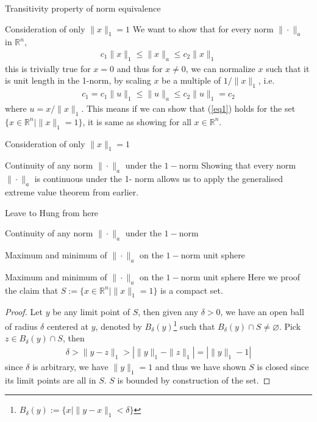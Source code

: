\documentclass[10pt,appendixnumberbeamer]{beamer}
\begin{document}
\begin{frame}{Transitivity property of norm equivalence}

\end{frame}

\begin{frame}{Consideration of only $\|x\|_1 = 1$}
We want to show that for every norm $\|\cdot\|_a$ in $\mathbb{R}^n$,
\begin{align*}
c_1\|x\|_1 \leq \|x\|_a \leq c_2\|x\|_1
\end{align*}
this is trivially true for $x=0$ and thus for $x \neq 0$, we can normalize $x$ such that it is unit length in the 1-norm, by scaling $x$ be a multiple of $1/\|x\|_1$, i.e.
\begin{align}
c_1 = c_1 \|u\|_1\leq \|u\|_a\leq c_2 \|u\|_1 = c_2 \label{eq1}
\end{align}
where $u = x/ \|x\|_1$. This means if we can show that (\ref{eq1}) holds for the set $\{x \in \mathbb{R}^n|\|x\|_1=1\}$, it is same as showing for all $x \in \mathbb{R}^n$.
\end{frame}

\begin{frame}{Consideration of only $\|x\|_1 = 1$}

\end{frame}


\begin{frame}{Continuity of any norm $\|\cdot\|_a$ under the $1-$norm}
Showing that every norm $\|\cdot\|_a$ is continuous under the 1- norm allows us to apply the generalised extreme value theorem from earlier. 

{\color{red}Leave to Hung from here}

\end{frame}

\begin{frame}{Continuity of any norm $\|\cdot\|_a$ under the $1-$norm}

\end{frame}


\begin{frame}{Maximum and minimum of $\|\cdot\|_a$ on the $1-$norm unit sphere}

\end{frame}

\begin{frame}{Maximum and minimum of $\|\cdot\|_a$ on the $1-$norm unit sphere}
Here we proof the claim that $S:=\{x \in \mathbb{R}^n| \|x\|_1=1\}$ is a compact set.
\begin{proof}
Let $y$ be any limit point of $S$, then given any $\delta >0$, we have an open ball of radius $\delta$ centered at $y$, denoted by $B_\delta(y)$\footnote{$B_\delta(y):=\{x \mid \|y-x\|_1 < \delta\}$} such that $B_\delta(y) \cap S \neq \varnothing$. Pick $z \in B_\delta(y) \cap S$, then 
\begin{align*}
\delta>\|y-z\|_1 > |\|y\|_1-\|z\|_1| = |\|y\|_1-1|
\end{align*}
since $\delta$ is arbitrary, we have $\|y\|_1=1$ and thus we have shown $S$ is closed since its limit points are all in $S$. $S$ is bounded by construction of the set. 

\end{proof}
\end{frame}
\end{document}
